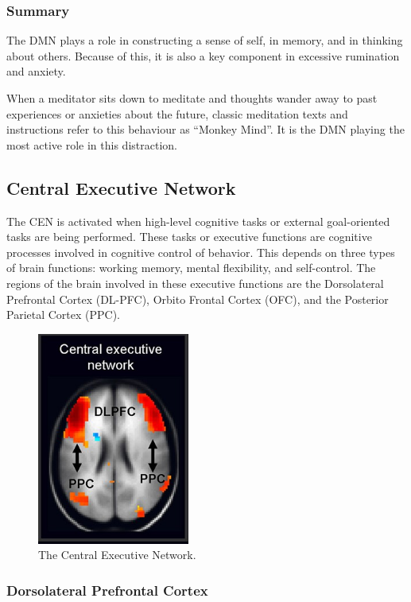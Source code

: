 \documentclass[a4paper, amsfonts, amssymb, amsmath, reprint, showkeys, nofootinbib, twoside]{revtex4-1}
\begin{document}
\subsubsection{Summary}

The DMN plays a role in constructing a sense of self, in memory,
and in thinking about others. Because of this, it is also a key component in excessive
rumination and anxiety. \cite{dmndepression}

When a meditator sits down to meditate and thoughts wander away to past experiences
or anxieties about the future, classic meditation texts and instructions refer to
this behaviour as ``Monkey Mind''. It is the DMN playing the most active role in this
distraction.

\subsection{Central Executive Network}

The CEN is activated when high-level cognitive tasks or external goal-oriented tasks
are being performed. These tasks or executive functions are cognitive processes involved in
cognitive control of behavior. This depends on three types of brain functions:
working memory, mental flexibility, and self-control. The regions of the brain
involved in these executive functions are the Dorsolateral Prefrontal Cortex
(DL-PFC), Orbito Frontal Cortex (OFC), and the Posterior Parietal Cortex (PPC).

\begin{figure}[H]
  \centering
  \includegraphics[width=5cm]{images/top-cen.jpg}
  \caption{The Central Executive Network.}
  \label{fig:top-cen}
\end{figure}

\subsubsection{Dorsolateral Prefrontal Cortex}
\end{document}
